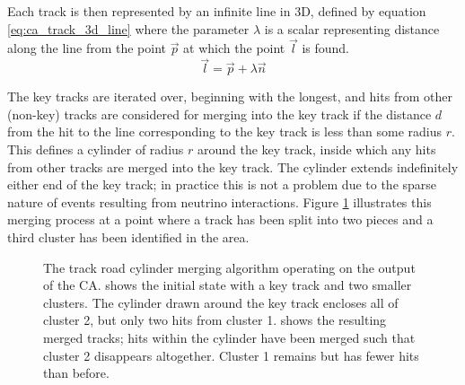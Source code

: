 Each track is then represented by an infinite line in 3D, defined by equation \ref{eq:ca_track_3d_line} where the parameter $\lambda$ is a scalar representing distance along the line from the point $\vec{p}$ at which the point $\vec{l}$ is found.
\begin{equation}\label{eq:ca_track_3d_line}
\vec{l} = \vec{p} + \lambda \vec{n}
\end{equation}

The key tracks are iterated over, beginning with the longest, and hits from other (non-key) tracks are considered for merging into the key track if the distance $d$ from the hit to the line corresponding to the key track is less than some radius $r$. This defines a cylinder of radius $r$ around the key track, inside which any hits from other tracks are merged into the key track. The cylinder extends indefinitely either end of the key track; in practice this is not a problem due to the sparse nature of events resulting from neutrino interactions. Figure \ref{fig:ca_merging_cylinder} illustrates this merging process at a point where a track has been split into two pieces and a third cluster has been identified in the area.

\begin{figure}
\centering
{}
\caption[Track road merging algorithm operating on CA output]{\label{fig:ca_merging_cylinder}The track road cylinder merging algorithm operating on the output of the \ac{CA}.  shows the initial state with a key track and two smaller clusters. The cylinder drawn around the key track encloses all of cluster 2, but only two hits from cluster 1.  shows the resulting merged tracks; hits within the cylinder have been merged such that cluster 2 disappears altogether. Cluster 1 remains but has fewer hits than before.}
\end{figure}

